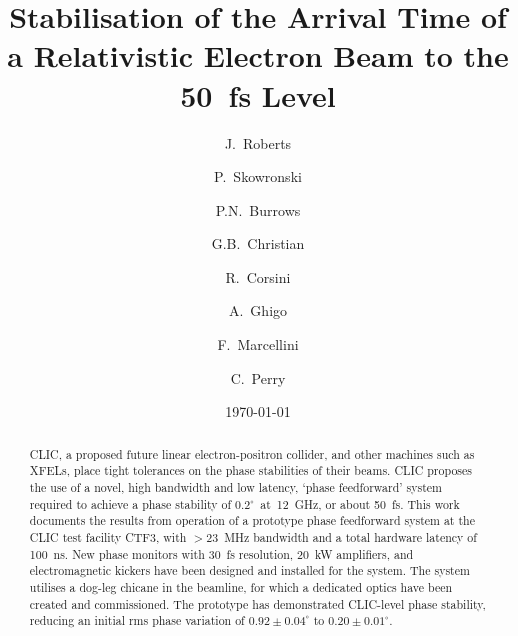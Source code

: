\documentclass[%
 reprint,
 superscriptaddress,
 amsmath,
 amssymb,
 prl,
]{revtex4-1}
\begin{document}
\title{Stabilisation of the Arrival Time of a Relativistic Electron Beam to 
the 50~fs Level}

\author{J.~Roberts}

\author{P.~Skowronski}

\author{P.N.~Burrows}

\author{G.B.~Christian}

\author{R.~Corsini}

\author{A.~Ghigo}

\author{F.~Marcellini}

\author{C.~Perry}


\date{\today}

\begin{abstract}
CLIC, a proposed future linear electron-positron collider, and other machines 
such as XFELs, place tight tolerances on the phase stabilities of their beams. 
CLIC proposes the use of a novel, high bandwidth and low latency, `phase 
feedforward' system required to achieve a phase stability of 
\(0.2^\circ\)~at~12~GHz, or about 50~fs. This work documents the results from 
operation of a prototype phase feedforward system at the CLIC test facility 
CTF3, with \(>23\)~MHz bandwidth and a total hardware latency of 100~ns. New 
phase monitors with 30~fs resolution, 20~kW amplifiers, 
and electromagnetic kickers have been designed and installed for the system. 
The system utilises a dog-leg chicane in the beamline, for which a dedicated 
optics have been created and commissioned. The prototype has demonstrated 
CLIC-level phase stability, reducing an initial rms phase variation of 
\(0.92\pm0.04^\circ\) to \(0.20\pm0.01^\circ\).
\end{abstract}
\end{document}
